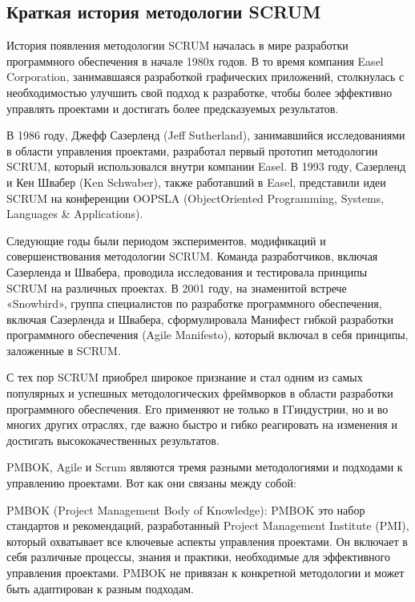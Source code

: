 \documentclass[letterpaper,10pt,russian]{sphinxmanual}
\begin{document}
\subsection{Краткая история методологии SCRUM}
\label{\detokenize{educational_materials/team_work_on_a_project/content:id7}}
\sphinxAtStartPar
История появления методологии SCRUM началась в мире разработки программного обеспечения в начале 1980\sphinxhyphen{}х годов. В то время компания Easel Corporation, занимавшаяся разработкой графических приложений, столкнулась с необходимостью улучшить свой подход к разработке, чтобы более эффективно управлять проектами и достигать более предсказуемых результатов.

\sphinxAtStartPar
В 1986 году, Джефф Сазерленд (Jeff Sutherland), занимавшийся исследованиями в области управления проектами, разработал первый прототип методологии SCRUM, который использовался внутри компании Easel. В 1993 году, Сазерленд и Кен Швабер (Ken Schwaber), также работавший в Easel, представили идеи SCRUM на конференции OOPSLA (Object\sphinxhyphen{}Oriented Programming, Systems, Languages \& Applications).

\sphinxAtStartPar
Следующие годы были периодом экспериментов, модификаций и совершенствования методологии SCRUM. Команда разработчиков, включая Сазерленда и Швабера, проводила исследования и тестировала принципы SCRUM на различных проектах. В 2001 году, на знаменитой встрече «Snowbird», группа специалистов по разработке программного обеспечения, включая Сазерленда и Швабера, сформулировала Манифест гибкой разработки программного обеспечения (Agile Manifesto), который включал в себя принципы, заложенные в SCRUM.

\sphinxAtStartPar
С тех пор SCRUM приобрел широкое признание и стал одним из самых популярных и успешных методологических фреймворков в области разработки программного обеспечения. Его применяют не только в IT\sphinxhyphen{}индустрии, но и во многих других отраслях, где важно быстро и гибко реагировать на изменения и достигать высококачественных результатов.

\sphinxAtStartPar
PMBOK, Agile и Scrum являются тремя разными методологиями и подходами к управлению проектами. Вот как они связаны между собой:

\sphinxAtStartPar
PMBOK (Project Management Body of Knowledge):
PMBOK \sphinxhyphen{} это набор стандартов и рекомендаций, разработанный Project Management Institute (PMI), который охватывает все ключевые аспекты управления проектами. Он включает в себя различные процессы, знания и практики, необходимые для эффективного управления проектами. PMBOK не привязан к конкретной методологии и может быть адаптирован к разным подходам.
\end{document}

